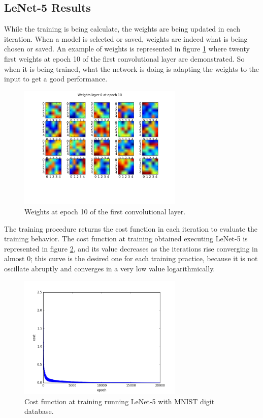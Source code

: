 \subsection{LeNet-5 Results} \label{sec:lenet_results}
While the training is being calculate, the weights are being updated in each iteration. When a  model is selected or saved, weights are indeed what is being chosen or saved. An example of weights is represented in figure \ref{fig:weights_lenet} where twenty first weights at epoch 10 of the first convolutional layer are demonstrated. So when it is being trained, what the network is doing is adapting the weights to the input to get a good performance.\\

\begin{figure}[htb]
\centering
\includegraphics[width=0.7\textwidth]{images/images_lenet/w_layer0_epoch10.png}
\caption{Weights at epoch 10 of the first convolutional layer.} \label{fig:weights_lenet}
\end{figure}

The training procedure returns the cost function in each iteration to evaluate the training behavior. The cost function at training obtained executing LeNet-5 is represented in figure \ref{fig:Lenetcost}, and its value decreases as the iterations rise converging in almost 0; this curve is the desired one for each training practice, because it is not oscillate abruptly and converges in a very low value logarithmically.\\

\begin{figure}[htb]
\centering
\includegraphics[width=0.7\textwidth]{images/images_lenet/cost_lenet.png}
\caption{Cost function at training running LeNet-5 with MNIST digit database.} \label{fig:Lenetcost}
\end{figure}

